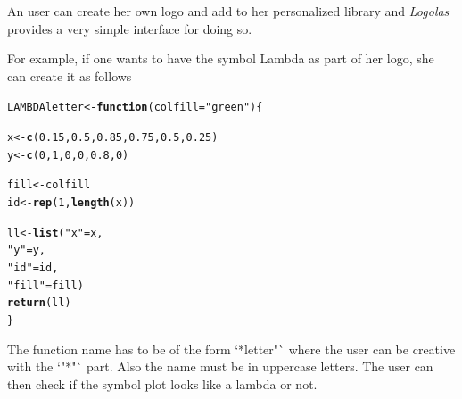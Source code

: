 \documentclass[12pt]{article}\usepackage[]{graphicx}\usepackage[usenames,dvipsnames]{color}
\makeatletter
\newcommand{\hlnum}[1]{\textcolor[rgb]{0.686,0.059,0.569}{#1}}%
\newcommand{\hlstr}[1]{\textcolor[rgb]{0.192,0.494,0.8}{#1}}%
\newcommand{\hlstd}[1]{\textcolor[rgb]{0.345,0.345,0.345}{#1}}%
\newcommand{\hlkwa}[1]{\textcolor[rgb]{0.161,0.373,0.58}{\textbf{#1}}}%
\newcommand{\hlkwb}[1]{\textcolor[rgb]{0.69,0.353,0.396}{#1}}%
\newcommand{\hlkwc}[1]{\textcolor[rgb]{0.333,0.667,0.333}{#1}}%
\newcommand{\hlkwd}[1]{\textcolor[rgb]{0.737,0.353,0.396}{\textbf{#1}}}%
\newenvironment{kframe}{%
 \def\at@end@of@kframe{}%
 \ifinner\ifhmode%
  \def\at@end@of@kframe{\end{minipage}}%
  \begin{minipage}{\columnwidth}%
 \fi\fi%
 \def\FrameCommand##1{\hskip\@totalleftmargin \hskip-\fboxsep
 \colorbox{shadecolor}{##1}\hskip-\fboxsep
     \hskip-\linewidth \hskip-\@totalleftmargin \hskip\columnwidth}%
 \MakeFramed {\advance\hsize-\width
   \@totalleftmargin\z@ \linewidth\hsize
   \@setminipage}}%
 {\par\unskip\endMakeFramed%
 \at@end@of@kframe}
\newenvironment{knitrout}{}{} %
\newcommand{\Logolas}{\textit{Logolas}}
\makeatother
\begin{document}
An user can create her own logo and add to her personalized library and \Logolas{} provides a very simple interface for doing so.

For example, if one wants to have the symbol Lambda as part of her logo,
she can create it as follows

\begin{knitrout}
\color{fgcolor}\begin{kframe}
\begin{alltt}
\hlstd{LAMBDAletter} \hlkwb{<-} \hlkwa{function}\hlstd{(}\hlkwc{colfill}\hlstd{=}\hlstr{"green"}\hlstd{)\{}

  \hlstd{x} \hlkwb{<-} \hlkwd{c}\hlstd{(}\hlnum{0.15}\hlstd{,} \hlnum{0.5}\hlstd{,} \hlnum{0.85}\hlstd{,} \hlnum{0.75}\hlstd{,} \hlnum{0.5}\hlstd{,} \hlnum{0.25}\hlstd{)}
  \hlstd{y} \hlkwb{<-} \hlkwd{c}\hlstd{(}\hlnum{0}\hlstd{,} \hlnum{1}\hlstd{,} \hlnum{0}\hlstd{,} \hlnum{0}\hlstd{,} \hlnum{0.8}\hlstd{,} \hlnum{0}\hlstd{)}

  \hlstd{fill} \hlkwb{<-} \hlstd{colfill}
  \hlstd{id} \hlkwb{<-} \hlkwd{rep}\hlstd{(}\hlnum{1}\hlstd{,} \hlkwd{length}\hlstd{(x))}

  \hlstd{ll} \hlkwb{<-} \hlkwd{list}\hlstd{(}\hlstr{"x"}\hlstd{= x,}
             \hlstr{"y"}\hlstd{= y,}
             \hlstr{"id"} \hlstd{= id,}
             \hlstr{"fill"} \hlstd{= fill)}
  \hlkwd{return}\hlstd{(ll)}
\hlstd{\}}
\end{alltt}
\end{kframe}
\end{knitrout}

The function name has to be of the form `*letter"` where the user can be creative with the `"*"` part. Also the name must be in uppercase letters. The user can then check if the symbol plot looks like a lambda or not.
\end{document}

